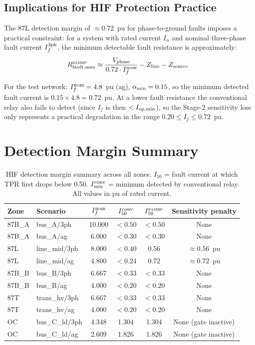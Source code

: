 \documentclass[12pt,a4paper]{article}
\newcommand{\SAMBP}{\textsc{sambp}}
\newcommand{\Iopmin}{I_{\rm op,min}}
\begin{document}
\subsection{Implications for HIF Protection Practice}

The 87L detection margin of $\approx 0.72$~pu for phase-to-ground
faults imposes a practical constraint: for a system with rated current
$I_n$ and nominal three-phase fault current $I_f^{\rm 3ph}$, the
minimum detectable fault resistance is approximately:
\begin{equation}
  R_{\rm fault,max}^{\SAMBP} \approx
    \frac{V_{\rm phase}}{0.72 \cdot I_f^{\rm nom}}
    - Z_{\rm line} - Z_{\rm source}
  \label{eq:Rmax}
\end{equation}

For the test network: $I_f^{\rm nom} = 4.8$~pu (ag), $\alpha_{\rm min} =
0.15$, so the minimum detected fault current is $0.15 \times 4.8 =
0.72$~pu.  At a lower fault resistance the conventional relay also fails
to detect (since $I_f$ is then $< \Iopmin$), so the Stage-2 sensitivity
loss only represents a practical degradation in the range $0.20 \leq
I_f \leq 0.72$~pu.

\section{Detection Margin Summary}

\begin{table}[ht]
\centering
\caption{HIF detection margin summary across all zones.
  $I_{50}$ = fault current at which TPR first drops below 0.50.
  $I_{\min}^{\rm conv}$ = minimum detected by conventional relay.
  All values in pu of rated current.}
\label{tab:summary}
\begin{tabular}{llcccc}
\toprule
Zone & Scenario &
  $I_f^{\rm nom}$ & $I_{50}^{\rm conv}$ & $I_{50}^{\SAMBP}$ &
  Sensitivity penalty \\
\midrule
87B\_A & bus\_A/3ph & 10.000 & $< 0.50$ & $< 0.50$ & None \\
87B\_A & bus\_A/ag  & 6.000  & $< 0.30$ & $< 0.30$ & None \\
87L   & line\_mid/3ph & 8.000  & $< 0.40$ & 0.56     & $\approx 0.56$~pu \\
87L   & line\_mid/ag  & 4.800  & $< 0.24$ & 0.72     & $\approx 0.72$~pu \\
87B\_B & bus\_B/3ph & 6.667  & $< 0.33$ & $< 0.33$ & None \\
87B\_B & bus\_B/ag  & 4.000  & $< 0.20$ & $< 0.20$ & None \\
87T   & trans\_hv/3ph & 6.667  & $< 0.33$ & $< 0.33$ & None \\
87T   & trans\_hv/ag  & 4.000  & $< 0.20$ & $< 0.20$ & None \\
OC    & bus\_C\_ld/3ph & 4.348 & 1.304    & 1.304    & None (gate inactive) \\
OC    & bus\_C\_ld/ag  & 2.609 & 1.826    & 1.826    & None (gate inactive) \\
\bottomrule
\end{tabular}
\end{table}
\end{document}
